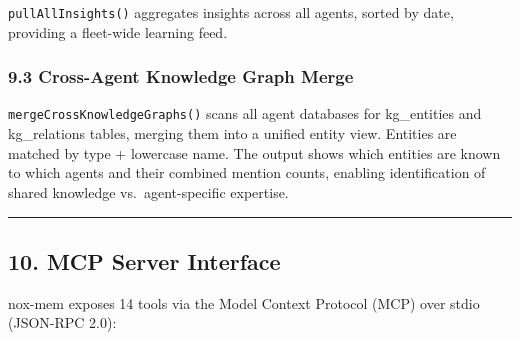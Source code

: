 \documentclass[
]{article}
\begin{document}
\texttt{pullAllInsights()} aggregates insights across all agents, sorted
by date, providing a fleet-wide learning feed.

\subsubsection{9.3 Cross-Agent Knowledge Graph
Merge}\label{cross-agent-knowledge-graph-merge}

\texttt{mergeCrossKnowledgeGraphs()} scans all agent databases for
kg\_entities and kg\_relations tables, merging them into a unified
entity view. Entities are matched by type + lowercase name. The output
shows which entities are known to which agents and their combined
mention counts, enabling identification of shared knowledge
vs.~agent-specific expertise.

\begin{center}\rule{0.5\linewidth}{0.5pt}\end{center}

\subsection{10. MCP Server Interface}\label{mcp-server-interface}

nox-mem exposes 14 tools via the Model Context Protocol (MCP) over stdio
(JSON-RPC 2.0):
\end{document}
